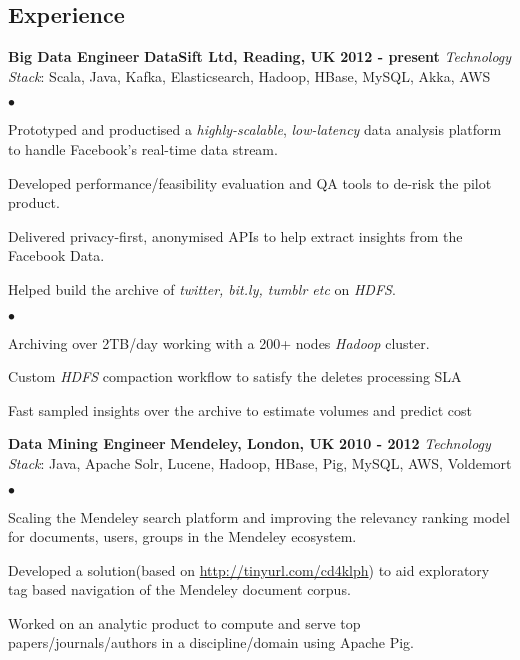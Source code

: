 \documentclass[margin,centered,11pt]{res}
\newenvironment{list2}{
  \begin{list}{$\bullet$}{%
      \setlength{\itemsep}{0in}
      \setlength{\parsep}{0in} \setlength{\parskip}{0in}
      \setlength{\topsep}{0in} \setlength{\partopsep}{0in} 
      \setlength{\leftmargin}{0.2in}}}{\end{list}}
\begin{document}
\begin{resume}
\section{\sc Experience}
\textbf{Big Data Engineer} \newline
\textbf{DataSift Ltd, Reading, UK} \hfill {\bf 2012 - present} \newline
\newline
\textit{Technology Stack}: Scala, Java, Kafka, Elasticsearch, Hadoop, HBase, MySQL, Akka, AWS 
\vspace{+.1in}
\begin{list2}
\item Prototyped and productised a \textit{highly-scalable}, \textit{low-latency} data analysis platform to handle Facebook's real-time data stream. 
\item Developed performance/feasibility evaluation and QA tools to de-risk the pilot product.
\item Delivered privacy-first, anonymised APIs to help extract insights from the Facebook Data.
\item Helped build the archive of {\em twitter, bit.ly, tumblr etc} on \textit{HDFS}.
\begin{list2}
 \item Archiving over 2TB/day working with a 200+ nodes \textit{Hadoop} cluster.
 \item Custom \textit{HDFS} compaction workflow to satisfy the deletes processing SLA 
 \item Fast sampled insights over the archive to estimate volumes and predict cost
\end{list2}
\end{list2}


\textbf{Data Mining Engineer}\newline
\textbf{Mendeley, London, UK} \hfill {\bf 2010 - 2012}\newline
\newline
\textit{Technology Stack}: Java, Apache Solr, Lucene, Hadoop, HBase, Pig, MySQL, AWS, Voldemort 
\vspace{+.1in}
\begin{list2}
\item Scaling the Mendeley search platform and improving the relevancy ranking model for documents, users, groups in the Mendeley ecosystem.
\item Developed a solution(based on \url{http://tinyurl.com/cd4klph}) to aid exploratory tag based navigation of the Mendeley document corpus.
\item Worked on an analytic product to compute and serve top papers/journals/authors in a discipline/domain using Apache Pig.
\end{list2}


\end{resume}
\end{document}
